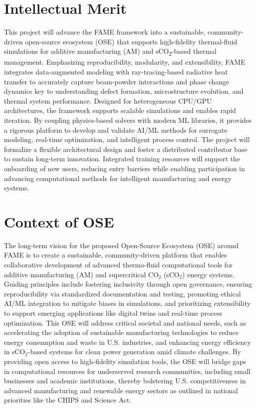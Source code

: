 \documentclass[11pt]{article}
\newcommand{\CO}[1]{CO\textsubscript{#1}}
\begin{document}
\section*{Intellectual Merit}
\vspace{-3pt}
\noindent
This project will advance the FAME framework into a sustainable, community-driven open-source ecosystem (OSE) that supports high-fidelity thermal-fluid simulations for additive manufacturing (AM) and s\CO{2}-based thermal management. Emphasizing reproducibility, modularity, and extensibility, FAME integrates data-augmented modeling with ray-tracing-based radiative heat transfer to accurately capture beam-powder interactions and phase change dynamics key to understanding defect formation, microstructure evolution, and thermal system performance. Designed for heterogeneous CPU/GPU architectures, the framework supports scalable simulations and enables rapid iteration. By coupling physics-based solvers with modern ML libraries, it provides a rigorous platform to develop and validate AI/ML methods for surrogate modeling, real-time optimization, and intelligent process control. The project will formalize a flexible architectural design and foster a distributed contributor base to sustain long-term innovation. Integrated training resources will support the onboarding of new users, reducing entry barriers while enabling participation in advancing computational methods for intelligent manufacturing and energy systems.
\vspace{-3pt}

\section*{Context of OSE}
\vspace{-3pt}
\noindent
The long-term vision for the proposed Open-Source Ecosystem (OSE) around FAME is to create a sustainable, community-driven platform that enables collaborative development of advanced thermo-fluid computational tools for additive manufacturing (AM) and supercritical CO$_2$ (sCO$_2$) energy systems. Guiding principles include fostering inclusivity through open governance, ensuring reproducibility via standardized documentation and testing, promoting ethical AI/ML integration to mitigate biases in simulations, and prioritizing extensibility to support emerging applications like digital twins and real-time process optimization. This OSE will address critical societal and national needs, such as accelerating the adoption of sustainable manufacturing technologies to reduce energy consumption and waste in U.S. industries, and enhancing energy efficiency in sCO$_2$-based systems for clean power generation amid climate challenges. By providing open access to high-fidelity simulation tools, the OSE will bridge gaps in computational resources for underserved research communities, including small businesses and academic institutions, thereby bolstering U.S. competitiveness in advanced manufacturing and renewable energy sectors as outlined in national priorities like the CHIPS and Science Act.
\end{document}
